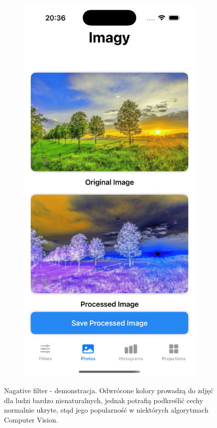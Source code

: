 \documentclass[a4paper]{article}
\begin{document}
\begin{figure}[H]
\begin{subfigure}{0.2\textwidth}
        \label{fig:dog_negative}
    \end{subfigure}
    \begin{subfigure}{0.2\textwidth}
        \centering
        \includegraphics[width=\linewidth]{images/trees_negative.png}
        \label{fig:trees_negative}
    \end{subfigure}
    \caption{Nagative filter - demonstracja. Odwrócone kolory prowadzą do zdjęć dla ludzi bardzo nienaturalnych, jednak potrafią podkreślić cechy normalnie ukryte, stąd jego popularność w niektórych algorytmach Computer Vision.}
    \label{fig:glitch}
\end{figure}
\end{document}
